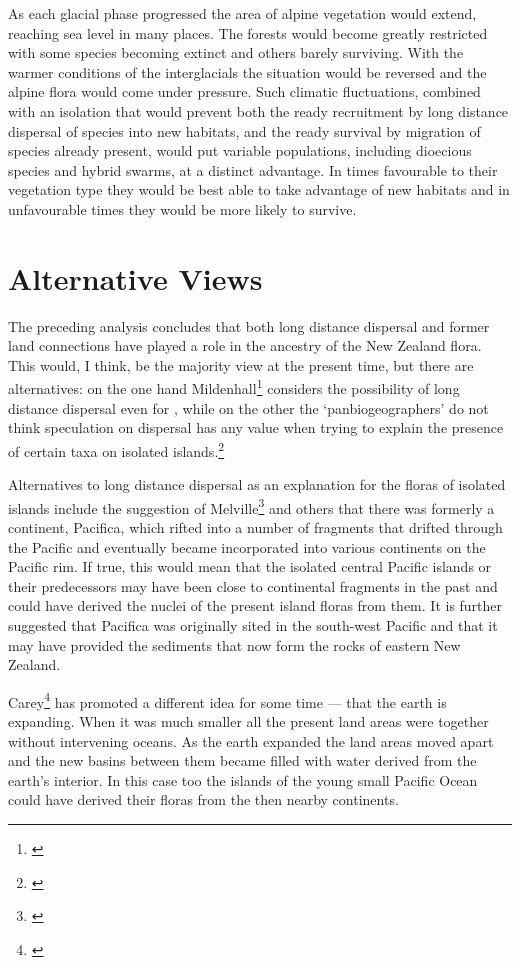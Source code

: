 As each glacial phase progressed the area of alpine vegetation would extend, reaching sea level in many places.
The forests would become greatly restricted with some species becoming extinct and others barely surviving.
With the warmer conditions of the interglacials the situation would be reversed and the alpine flora would come under pressure.
Such climatic fluctuations, combined with an isolation that would prevent both the ready recruitment by long distance dispersal of species into new habitats, and the ready survival by migration of species already present, would put variable populations, including dioecious species and hybrid swarms, at a distinct advantage.
In times favourable to their vegetation type they would be best able to take advantage of new habitats and in unfavourable times they would be more likely to survive.

\section{Alternative Views}

The preceding analysis concludes that both long distance dispersal and former land connections have played a role in the ancestry of the New Zealand flora.
This would, I think, be the majority view at the present time, but there are alternatives: on the one hand Mildenhall\footnote{\cite{mildenhall1980new}} considers the possibility of long distance dispersal even for , while on the other the `panbiogeographers' do not think speculation on dispersal has any value when trying to explain the presence of certain taxa on isolated islands.\footnote{\cite{craw1982phylogenetics}}

Alternatives to long distance dispersal as an explanation for the floras of isolated islands include the suggestion of Melville\footnote{\cite{melville1981vicarious}} and others that there was formerly a continent, Pacifica, which rifted into a number of fragments that drifted through the Pacific and eventually became incorporated into various continents on the Pacific rim.
If true, this would mean that the isolated central Pacific islands or their predecessors may have been close to continental fragments in the past and could have derived the nuclei of the present island floras from them.
It is further suggested that Pacifica was originally sited in the south-west Pacific and that it may have provided the sediments that now form the rocks of eastern New Zealand.

Carey\footnote{\cite{carey1983necessity}} has promoted a different idea for some time --- that the earth is expanding.
When it was much smaller all the present land areas were together without intervening oceans.
As the earth expanded the land areas moved apart and the new basins between them became filled with water derived from the earth's interior.
In this case too the islands of the young small Pacific Ocean could have derived their floras from the then nearby continents.

